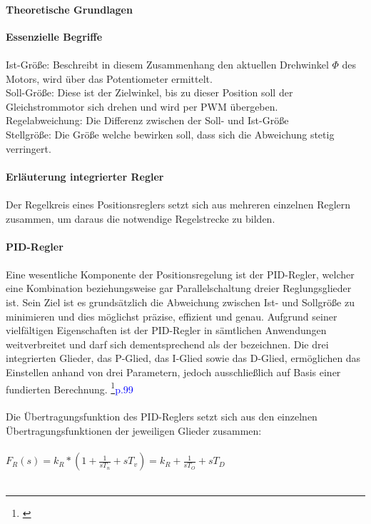 \documentclass[titlepage,12pt,twoside]{article}
\begin{document}
\paragraph{Theoretische Grundlagen}
\hfill \break
\hfill \break
\textbf{Essenzielle Begriffe} \\
\\
Ist-Größe: Beschreibt in diesem Zusammenhang den aktuellen Drehwinkel $\Phi$ des Motors, 
wird über das Potentiometer ermittelt. \\
Soll-Größe: Diese ist der Zielwinkel, bis zu dieser Position soll der Gleichstrommotor 
sich drehen und wird per PWM übergeben. \\
Regelabweichung: Die Differenz zwischen der Soll- und Ist-Größe \\
Stellgröße: Die Größe welche bewirken soll, dass sich die Abweichung stetig 
verringert. \\
\\
\textbf{Erläuterung integrierter Regler} \\
\\
Der Regelkreis eines Positionsreglers setzt sich aus mehreren einzelnen 
Reglern zusammen, um daraus die notwendige Regelstrecke zu bilden. \\
\\
\textbf{PID-Regler} \\
\\
Eine wesentliche Komponente der Positionsregelung ist der PID-Regler, 
welcher eine Kombination beziehungsweise gar Parallelschaltung dreier 
Reglungsglieder ist. Sein Ziel ist es grundsätzlich die Abweichung 
zwischen Ist- und Sollgröße zu minimieren und dies möglichst präzise, 
effizient und genau. Aufgrund seiner vielfältigen Eigenschaften ist der 
PID-Regler in sämtlichen Anwendungen weitverbreitet und darf sich 
dementsprechend als der  bezeichnen. Die drei 
integrierten Glieder, das P-Glied, das I-Glied sowie das D-Glied, 
ermöglichen das Einstellen anhand von drei Parametern, jedoch 
ausschließlich auf Basis einer fundierten Berechnung. \footnote{\cite{Haager}}\textcolor{blue}{p.99} \\
\\
Die Übertragungsfunktion des PID-Reglers setzt sich aus den einzelnen 
Übertragungsfunktionen der jeweiligen Glieder zusammen: \\
\\
$F_{R}(s)=k_{R}*(1+\frac{1}{sT_{n}}+sT_{v})=k_{R}+\frac{1}{sT_{O}}+sT_{D} $ \\
\\
\end{document}
